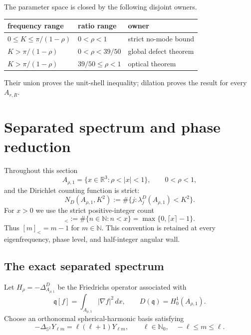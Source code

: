 \documentclass[11pt]{article}
\numberwithin{equation}{section}
\theoremstyle{definition}
\theoremstyle{remark}
\begin{document}
\begin{samepage}
The parameter space is closed by the following disjoint owners.
\begin{center}
\begin{tabular}{@{}lll@{}}
\toprule
frequency range&ratio range&owner\\
\midrule
\(0\leq K\leq\pi/(1-\rho)\)&\(0<\rho<1\)&strict no-mode bound\\
\(K>\pi/(1-\rho)\)&\(0<\rho<39/50\)&global defect theorem\\
\(K>\pi/(1-\rho)\)&\(39/50\leq\rho<1\)&optical theorem\\
\bottomrule
\end{tabular}
\end{center}
\end{samepage}
Their union proves the unit-shell inequality; dilation proves the result for
every \(A_{r,R}\).

\section{Separated spectrum and phase reduction}
\label{sec:separated-spectrum}

Throughout this section
\[
  A_{\rho,1}=\{x\in\mathbb R^3:\rho<|x|<1\},
  \qquad 0<\rho<1,
\]
and the Dirichlet counting function is strict:
\[
  N_D(A_{\rho,1},K^2)
  :=\#\{j:\lambda_j^D(A_{\rho,1})<K^2\}.
\]
For \(x>0\) we use the strict positive-integer count
\begin{equation}
  [x]_<:=\#\{n\in\mathbb N:n<x\}
  =\max\{0,\lceil x\rceil-1\}.
  \label{eq:sc-strict-bracket}
\end{equation}
Thus \([m]_< =m-1\) for \(m\in\mathbb N\).  This convention is retained
at every eigenfrequency, phase level, and half-integer angular wall.

\subsection{The exact separated spectrum}

Let \(H_\rho=-\Delta^D_{A_{\rho,1}}\) be the Friedrichs operator associated
with
\[
  \mathfrak q[f]=\int_{A_{\rho,1}}|\nabla f|^2\,dx,
  \qquad D(\mathfrak q)=H_0^1(A_{\rho,1}).
\]
Choose an orthonormal spherical-harmonic basis satisfying
\[
  -\Delta_{\mathbb S^2}Y_{\ell m}
  =\ell(\ell+1)Y_{\ell m},
  \qquad \ell\in\mathbb N_0,
  \quad -\ell\le m\le\ell.
\]
\end{document}
